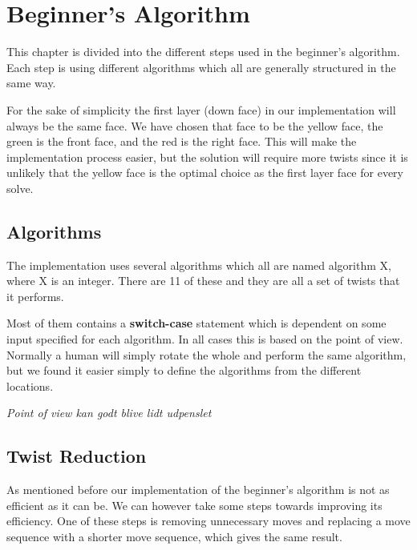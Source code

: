 \chapter{Beginner's Algorithm}\label{chap:beginnerImplement}
This chapter is divided into the different steps used in the beginner's algorithm.
Each step is using different algorithms which all are generally structured in the same way. 

For the sake of simplicity the first layer (down face) in our implementation will always be the same face. We have chosen that face to be the yellow face, the green is the front face, and the red is the right face. This will make the implementation process easier, but the solution will require more twists since it is unlikely that the yellow face is the optimal choice as the first layer face for every solve.

\section{Algorithms}
The implementation uses several algorithms which all are named algorithm X, where X is an integer. There are 11 of these and they are all a set of twists that it performs.

Most of them contains a \textbf{switch-case} statement which is dependent on some input specified for each algorithm. In all cases this is based on the point of view. Normally a human will simply rotate the whole \cube{} and perform the same algorithm, but we found it easier simply to define the algorithms from the different locations.

\emph{Point of view kan godt blive lidt udpenslet}









\section{Twist Reduction}
As mentioned before our implementation of the beginner's algorithm is not as efficient as it can be. We can however take some steps towards improving its efficiency. One of these steps is removing unnecessary moves and replacing a move sequence with a shorter move sequence, which gives the same result.

